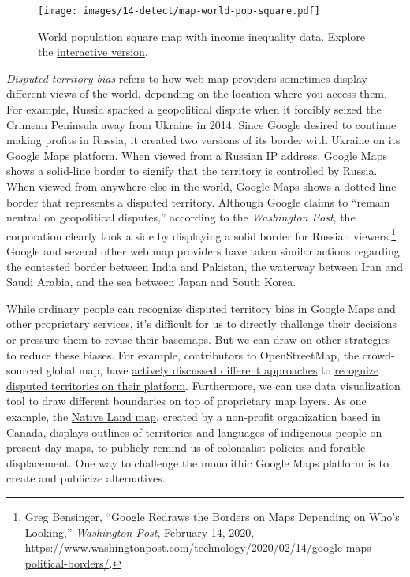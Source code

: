 \documentclass[
  english,
]{book}
\begin{document}
\begin{figure}
\centering
\texttt{[image: images/14-detect/map-world-pop-square.pdf]}
\caption{\label{fig:map-world-pop-square}World population square map with income inequality data. Explore the \href{https://datawrapper.dwcdn.net/YfNDe/}{interactive version}.}
\end{figure}

\emph{Disputed territory bias} refers to how web map providers sometimes display different views of the world, depending on the location where you access them. For example, Russia sparked a geopolitical dispute when it forcibly seized the Crimean Peninsula away from Ukraine in 2014. Since Google desired to continue making profits in Russia, it created two versions of its border with Ukraine on its Google Maps platform. When viewed from a Russian IP address, Google Maps shows a solid-line border to signify that the territory is controlled by Russia. When viewed from anywhere else in the world, Google Maps shows a dotted-line border that represents a disputed territory. Although Google claims to ``remain neutral on geopolitical disputes,'' according to the \emph{Washington Post}, the corporation clearly took a side by displaying a solid border for Russian viewers.\footnote{Greg Bensinger, {``Google {Redraws} the {Borders} on {Maps Depending} on {Who}'s {Looking},''} \emph{Washington Post}, February 14, 2020, \url{https://www.washingtonpost.com/technology/2020/02/14/google-maps-political-borders/}.} Google and several other web map providers have taken similar actions regarding the contested border between India and Pakistan, the waterway between Iran and Saudi Arabia, and the sea between Japan and South Korea.

While ordinary people can recognize disputed territory bias in Google Maps and other proprietary services, it's difficult for us to directly challenge their decisions or pressure them to revise their basemaps. But we can draw on other strategies to reduce these biases. For example, contributors to OpenStreetMap, the crowd-sourced global map, have \href{https://wiki.openstreetmap.org/wiki/Proposed_features/Mapping_disputed_boundaries}{actively discussed different approaches} to \href{https://wiki.openstreetmap.org/wiki/Disputed_territories}{recognize disputed territories on their platform}. Furthermore, we can use data visualization tool to draw different boundaries on top of proprietary map layers. As one example, the \href{https://native-land.ca}{Native Land map}, created by a non-profit organization based in Canada, displays outlines of territories and languages of indigenous people on present-day maps, to publicly remind us of colonialist policies and forcible displacement. One way to challenge the monolithic Google Maps platform is to create and publicize alternatives.
\end{document}
